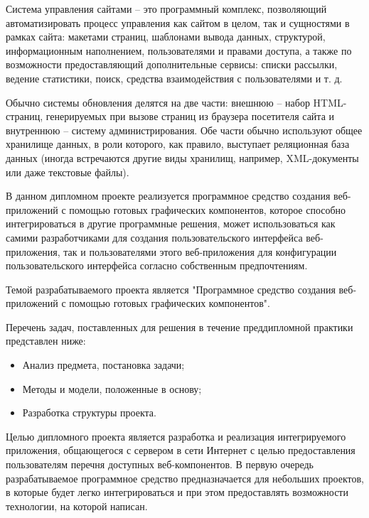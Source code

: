Система управления сайтами – это программный комплекс, позволяющий автоматизировать процесс управления как сайтом в целом, так и сущностями в рамках сайта: макетами страниц, шаблонами вывода данных, структурой, информационным наполнением, пользователями и правами доступа, а также по возможности предоставляющий дополнительные сервисы: списки рассылки, ведение статистики, поиск, средства взаимодействия с пользователями и т. д.

Обычно системы обновления делятся на две части: внешнюю – набор HTML-страниц, генерируемых при вызове страниц из браузера посетителя сайта и внутреннюю – систему администрирования. Обе части обычно используют общее хранилище данных, в роли которого, как правило, выступает реляционная база данных (иногда встречаются другие виды хранилищ, например, XML-документы или даже текстовые файлы).

В данном дипломном проекте реализуется программное средство создания веб-приложений с помощью готовых графических компонентов, которое способно интегрироваться в другие программные решения, может использоваться как самими разработчиками для создания пользовательского интерфейса веб-приложения, так и пользователями этого веб-приложения для конфигурации пользовательского интерфейса согласно собственным предпочтениям.

Темой разрабатываемого проекта является "Программное средство создания веб-приложений с помощью готовых графических компонентов". 

Перечень задач, поставленных для решения в течение преддипломной практики представлен ниже:

\begin{itemize}
    \item Анализ предмета, постановка задачи;
    \item Методы и модели, положенные в основу;
    \item Разработка структуры проекта. 
\end{itemize}


Целью дипломного проекта является разработка и реализация интегрируемого приложения, общающегося с сервером в сети Интернет с целью предоставления пользователям перечня доступных веб-компонентов. В первую очередь разрабатываемое программное средство предназначается для небольших проектов, в которые будет легко интегрироваться и при этом предоставлять возможности технологии, на которой написан.
